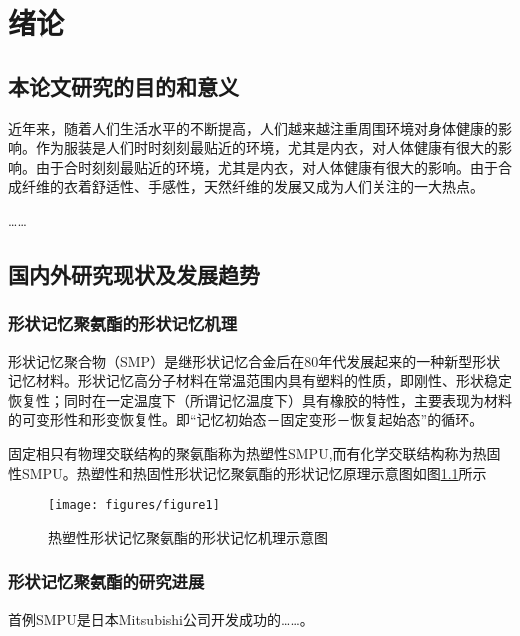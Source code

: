 

\label{第一章开始}
\chapter{绪论}

\section{本论文研究的目的和意义}

近年来，随着人们生活水平的不断提高，人们越来越注重周围环境对身体健康的影响。作为服装是人们时时刻刻最贴近的环境，尤其是内衣，对人体健康有很大的影响。由于合时刻刻最贴近的环境，尤其是内衣，对人体健康有很大的影响。由于合成纤维的衣着舒适性、手感性，天然纤维的发展又成为人们关注的一大热点。

……\cite{Takahashi1996Structure,Xia2002Analysis,Jiang1989,Mao2000Motion,Feng1998}

\section{国内外研究现状及发展趋势}

\subsection{形状记忆聚氨酯的形状记忆机理}

形状记忆聚合物（SMP）是继形状记忆合金后在80年代发展起来的一种新型形状记忆材料\cite{Jiang2005Size}。形状记忆高分子材料在常温范围内具有塑料的性质，即刚性、形状稳定恢复性；同时在一定温度下（所谓记忆温度下）具有橡胶的特性，主要表现为材料的可变形性和形变恢复性。即“记忆初始态－固定变形－恢复起始态”的循环。

固定相只有物理交联结构的聚氨酯称为热塑性SMPU,而有化学交联结构称为热固性SMPU。热塑性和热固性形状记忆聚氨酯的形状记忆原理示意图如图\ref{fig:diagram}所示

\begin{figure}
	\centering
	\texttt{[image: figures/figure1]}
	\caption{热塑性形状记忆聚氨酯的形状记忆机理示意图}\label{fig:diagram}
\end{figure}


\subsection{形状记忆聚氨酯的研究进展}
首例SMPU是日本Mitsubishi公司开发成功的……。

